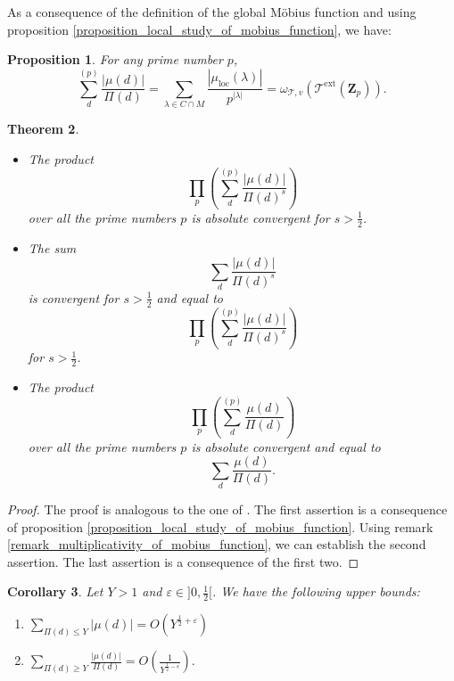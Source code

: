 \documentclass{proc-l}
\newcommand{\Z}{\mathbf{Z}}
\DeclareMathOperator{\loc}{loc}
\DeclareMathOperator{\ext}{ext}
\newcommand{\stackT}{\mathcal{T}}
\newcommand{\w}{\omega}
\newtheorem{theorem}{Theorem}[section]
\newtheorem{cor}[theorem]{Corollary}
\newtheorem{prop}[theorem]{Proposition}
\theoremstyle{definition}
\theoremstyle{remark}
\numberwithin{equation}{section}
\begin{document}
As a consequence of the definition of the global Möbius function and using proposition \ref{proposition_local_study_of_mobius_function}, we have:

\begin{prop}\label{value_local_mesure_mobius_function}
    For any prime number $p$, $$\sum\limits_{d}^{(p)} \frac{|\mu(d)|}{\Pi(d)} = \sum\limits_{\lambda \in C \cap M} \frac{|\mu_{\loc}(\lambda)|}{p^{|\lambda|}} = \w_{\stackT,v}(\stackT^{\ext}(\Z_p)) .$$
\end{prop}



\begin{theorem}\label{value_global_mesure_mobius_fonction}

\begin{itemize}
    \item The product $$\prod\limits_p \left( \sum\limits_{d}^{(p)} \frac{|\mu(d)|}{\Pi(d)^s} \right)$$ over all the prime numbers $p$ is absolute convergent for $s > \frac{1}{2}$.
    \item The sum $$\sum\limits_d \frac{|\mu(d)|}{\Pi(d)^s}$$ is convergent for $s > \frac{1}{2}$ and equal to $$\prod\limits_p \left( \sum\limits_{d}^{(p)} \frac{|\mu(d)|}{\Pi(d)^s} \right)$$ for $s > \frac{1}{2}$.
    \item The product $$\prod\limits_p \left( \sum\limits_{d}^{(p)} \frac{\mu(d)}{\Pi(d)} \right)$$ over all the prime numbers $p$ is absolute convergent and equal to $$\sum\limits_d \frac{\mu(d)}{\Pi(d)} .$$
\end{itemize}    
\end{theorem}

\begin{proof}
   The proof is analogous to the one of \cite[Lemma 11.15]{salberger_torsor}. The first assertion is a consequence of proposition \ref{proposition_local_study_of_mobius_function}. Using remark \ref{remark_multiplicativity_of_mobius_function}, we can establish the second assertion. The last assertion is a consequence of the first two.
\end{proof}

\begin{cor}\label{majoration_fonction_de_mobius}
Let $Y > 1$ and $\varepsilon \in ]0,\frac{1}{2}[$. We have the following upper bounds:
    \begin{enumerate}
        \item $\sum\limits_{\Pi(d)\leqslant Y} |\mu(d)| = O\left( Y^{\frac{1}{2} + \varepsilon}\right)$
        \item $\sum\limits_{\Pi(d)\geqslant Y} \frac{| \mu(d) |}{\Pi(d)} = O\left( \frac{1}{Y^{ \frac{1}{2} - \epsilon}} \right).$
    \end{enumerate}
\end{cor}
\end{document}
